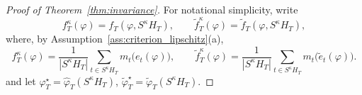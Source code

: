 \documentclass[12pt]{article}
\numberwithin{equation}{section}
\begin{document}
\begin{proof}[Proof of Theorem~\ref{thm:invariance}]
For notational simplicity, write
\begin{equation}
f_T^\kappa(\varphi)=f_T(\varphi,S^\kappa H_T),
\qquad
\tilde f_T^\kappa(\varphi)=\tilde f_T(\varphi,S^\kappa H_T),
\end{equation}
where, by Assumption~\ref{ass:criterion_lipschitz}(a),
\begin{equation}\label{eq:fTkfTk}
f_T^\kappa(\varphi)
=
\frac{1}{|S^\kappa H_T|}
\sum_{t\in S^\kappa H_T}
m_t\bigl(e_t(\varphi)\bigr),
\qquad
\tilde f_T^\kappa(\varphi)
=
\frac{1}{|S^\kappa H_T|}
\sum_{t\in S^\kappa H_T}
m_t\bigl(\tilde e_t(\varphi)\bigr).
\end{equation}
and let
$\varphi_T^\star=\hat{\varphi}_T(S^\kappa H_T)$,
$\tilde{\varphi}_T^\star=\tilde{\varphi}_T(S^\kappa H_T)$.


\end{proof}
\end{document}
